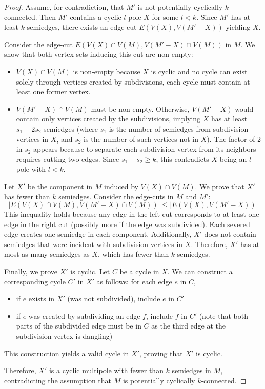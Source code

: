 \documentclass[12pt, twoside]{book}
\begin{document}
\begin{proof}
	Assume, for contradiction, that $M'$ is not potentially cyclically $k$-connected. Then $M'$ contains a cyclic $l$-pole $X$ for some $l<k$. Since $M'$ has at least $k$ semiedges, there exists an edge-cut $E(V(X),V(M'-X))$ yielding $X$.
	
	Consider the edge-cut $E(V(X)\cap V(M), V(M'-X)\cap V(M))$ in $M$. We show that both vertex sets inducing this cut are non-empty:
	\begin{itemize}
		\item $V(X)\cap V(M)$ is non-empty because $X$ is cyclic and no cycle can exist solely through vertices created by subdivisions, each cycle must contain at least one former vertex.
		\item $V(M'-X)\cap V(M)$ must be non-empty. Otherwise, $V(M'-X)$ would contain only vertices created by the subdivisions, implying $X$ has at least $s_1+2s_2$ semiedges (where $s_1$ is the number of semiedges from subdivision vertices in $X$, and $s_2$ is the number of such vertices not in $X$). The factor of 2 in $s_2$ appears because to separate each subdivision vertex from its neighbors requires cutting two edges. Since $s_1+s_2\geq k$, this contradicts $X$ being an $l$-pole with $l<k$.
	\end{itemize}
	
	Let $X'$ be the component in $M$ induced by $V(X)\cap V(M)$. We prove that $X'$ has fewer than $k$ semiedges. Consider the edge-cuts in $M$ and $M'$:
	$$|E(V(X)\cap V(M), V(M'-X)\cap V(M))|\leq |E(V(X),V(M'-X))|$$
	This inequality holds because any edge in the left cut corresponds to at least one edge in the right cut (possibly more if the edge was subdivided). Each severed edge creates one semiedge in each component. Additionally, $X'$ does not contain semiedges that were incident with subdivision vertices in $X$. Therefore, $X'$ has at most as many semiedges as $X$, which has fewer than $k$ semiedges.
	
	Finally, we prove $X'$ is cyclic. Let $C$ be a cycle in $X$. We can construct a corresponding cycle $C'$ in $X'$ as follows: for each edge $e$ in $C$,
	\begin{itemize}
		\item if $e$ exists in $X'$ (was not subdivided), include $e$ in $C'$
		\item if $e$ was created by subdividing an edge $f$, include $f$ in $C'$ (note that both parts of the subdivided edge must be in $C$ as the third edge at the subdivision vertex is dangling)
	\end{itemize}
	This construction yields a valid cycle in $X'$, proving that $X'$ is cyclic.
	
	Therefore, $X'$ is a cyclic multipole with fewer than $k$ semiedges in $M$, contradicting the assumption that $M$ is potentially cyclically $k$-connected.
\end{proof}
\end{document}
